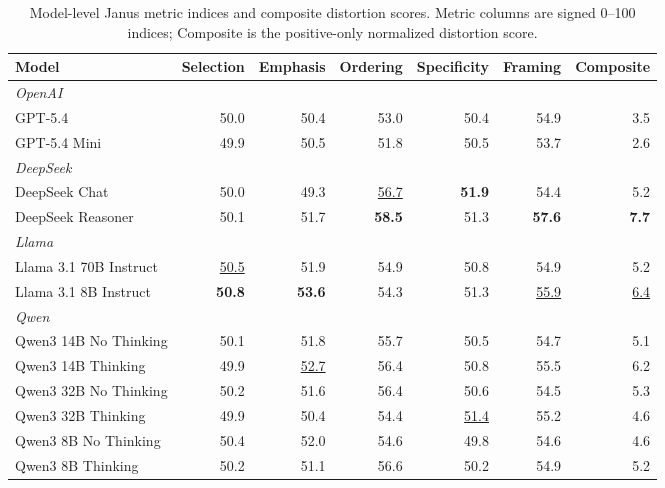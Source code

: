 \begin{table}[t]
\centering
\small
\caption{Model-level Janus metric indices and composite distortion scores. Metric columns are signed 0--100 indices; Composite is the positive-only normalized distortion score.}
\label{tab:janus-model-core-metrics}
\begin{tabular}{lrrrrrr}
\toprule
Model & Selection & Emphasis & Ordering & Specificity & Framing & Composite \\
\midrule
\multicolumn{7}{l}{\textit{OpenAI}} \\
GPT-5.4 & 50.0 & 50.4 & 53.0 & 50.4 & 54.9 & 3.5 \\
GPT-5.4 Mini & 49.9 & 50.5 & 51.8 & 50.5 & 53.7 & 2.6 \\
\midrule
\multicolumn{7}{l}{\textit{DeepSeek}} \\
DeepSeek Chat & 50.0 & 49.3 & \underline{56.7} & \textbf{51.9} & 54.4 & 5.2 \\
DeepSeek Reasoner & 50.1 & 51.7 & \textbf{58.5} & 51.3 & \textbf{57.6} & \textbf{7.7} \\
\midrule
\multicolumn{7}{l}{\textit{Llama}} \\
Llama 3.1 70B Instruct & \underline{50.5} & 51.9 & 54.9 & 50.8 & 54.9 & 5.2 \\
Llama 3.1 8B Instruct & \textbf{50.8} & \textbf{53.6} & 54.3 & 51.3 & \underline{55.9} & \underline{6.4} \\
\midrule
\multicolumn{7}{l}{\textit{Qwen}} \\
Qwen3 14B No Thinking & 50.1 & 51.8 & 55.7 & 50.5 & 54.7 & 5.1 \\
Qwen3 14B Thinking & 49.9 & \underline{52.7} & 56.4 & 50.8 & 55.5 & 6.2 \\
Qwen3 32B No Thinking & 50.2 & 51.6 & 56.4 & 50.6 & 54.5 & 5.3 \\
Qwen3 32B Thinking & 49.9 & 50.4 & 54.4 & \underline{51.4} & 55.2 & 4.6 \\
Qwen3 8B No Thinking & 50.4 & 52.0 & 54.6 & 49.8 & 54.6 & 4.6 \\
Qwen3 8B Thinking & 50.2 & 51.1 & 56.6 & 50.2 & 54.9 & 5.2 \\
\bottomrule
\end{tabular}
\end{table}
